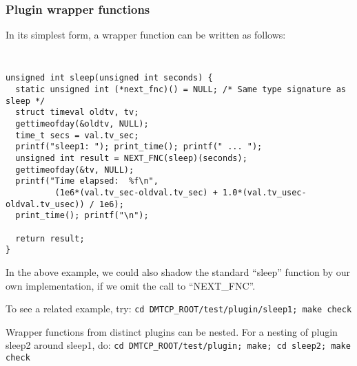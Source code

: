 \documentclass{article}
\begin{document}
%
%

\subsubsection{Plugin wrapper functions}
\label{sec:wrappers}

In its simplest form, a wrapper function can be written as follows:

{\tt
\begin{verbatim}
unsigned int sleep(unsigned int seconds) {
  static unsigned int (*next_fnc)() = NULL; /* Same type signature as sleep */
  struct timeval oldtv, tv;
  gettimeofday(&oldtv, NULL);
  time_t secs = val.tv_sec;
  printf("sleep1: "); print_time(); printf(" ... ");
  unsigned int result = NEXT_FNC(sleep)(seconds);
  gettimeofday(&tv, NULL);
  printf("Time elapsed:  %f\n",
          (1e6*(val.tv_sec-oldval.tv_sec) + 1.0*(val.tv_usec-oldval.tv_usec)) / 1e6);
  print_time(); printf("\n");

  return result;
}
\end{verbatim}
}

In the above example, we could also shadow the standard ``sleep'' function
by our own implementation, if we omit the call to ``{NEXT\_FNC}''.

\noindent
To see a related example, try:
\hfill\break
\medskip\noindent
  \hspace{0.3truein} {\tt cd DMTCP\_ROOT/test/plugin/sleep1; make check}
\medskip

\noindent
Wrapper functions from distinct plugins can be nested.  For a nesting
of plugin sleep2 around sleep1, do:
\hfill\break
\medskip\noindent
  \hspace{0.3truein} {\tt cd DMTCP\_ROOT/test/plugin; make; cd sleep2; make check}
\medskip
\end{document}
